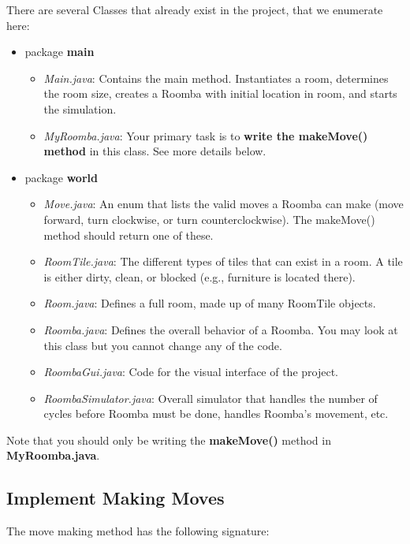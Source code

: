 \documentclass[paper=a4, fontsize=11pt, parskip=full]{scrartcl} %
\numberwithin{equation}{section} %
\numberwithin{figure}{section} %
\numberwithin{table}{section} %
\begin{document}
There are several Classes that already exist in the project, that we enumerate here:

\begin{itemize}
\item package \textbf{main}
	\begin{itemize}
	\item \emph{Main.java}: Contains the main method. Instantiates a room, determines the room size, creates a Roomba with initial location in room, and starts the simulation.
	\item \emph{MyRoomba.java}: Your primary task is to \textbf{write the makeMove() method} in this class. See more details below.
	\end{itemize}
\item package \textbf{world}
	\begin{itemize}
	\item \emph{Move.java}: An enum that lists the valid moves a Roomba can make (move forward, turn clockwise, or turn counterclockwise). The makeMove() method should return one of these.
	\item \emph{RoomTile.java}: The different types of tiles that can exist in a room. A tile is either dirty, clean, or blocked (e.g., furniture is located there).
	\item \emph{Room.java}: Defines a full room, made up of many RoomTile objects.
	\item \emph{Roomba.java}: Defines the overall behavior of a Roomba. You may look at this class but you cannot change any of the code.
	\item \emph{RoombaGui.java}: Code for the visual interface of the project.
	\item \emph{RoombaSimulator.java}: Overall simulator that handles the number of cycles before Roomba must be done, handles Roomba's movement, etc.
	\end{itemize}
\end{itemize}

Note that you should only be writing the \textbf{makeMove()} method in \textbf{MyRoomba.java}.


\subsection{Implement Making Moves}

The move making method has the following signature:
\end{document}
